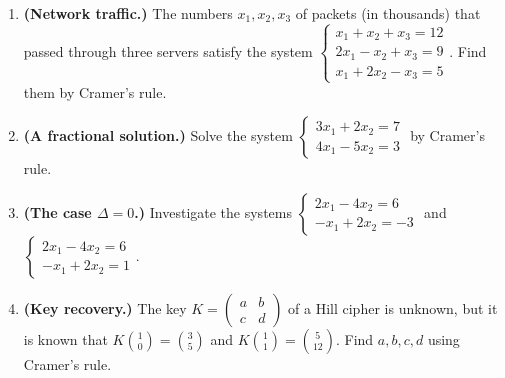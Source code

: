 \begin{enumerate}[label=\arabic*., leftmargin=*]
\item \textbf{(Network traffic.)} The numbers $x_1,x_2,x_3$ of packets (in thousands) that passed through three servers satisfy the system $\begin{cases}x_1+x_2+x_3=12\\2x_1-x_2+x_3=9\\x_1+2x_2-x_3=5\end{cases}$. Find them by Cramer’s rule.
\item \textbf{(A fractional solution.)} Solve the system $\begin{cases}3x_1+2x_2=7\\4x_1-5x_2=3\end{cases}$ by Cramer’s rule.
\item \textbf{(The case $\Delta=0$.)} Investigate the systems $\begin{cases}2x_1-4x_2=6\\-x_1+2x_2=-3\end{cases}$ and $\begin{cases}2x_1-4x_2=6\\-x_1+2x_2=1\end{cases}$.
\item \textbf{(Key recovery.)} The key $K=\begin{pmatrix}a&b\\c&d\end{pmatrix}$ of a Hill cipher is unknown, but it is known that $K\binom{1}{0}=\binom{3}{5}$ and $K\binom{1}{1}=\binom{5}{12}$. Find $a,b,c,d$ using Cramer’s rule.
\end{enumerate}

